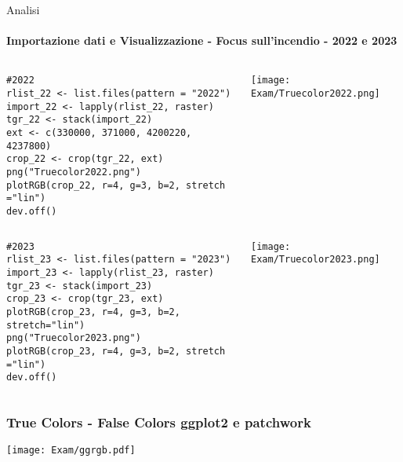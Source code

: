\documentclass{beamer}  %
\begin{document}
\begin{frame}[fragile]{Analisi}
    \framesubtitle{Importazione dati e Visualizzazione - Focus sull'incendio - 2022 e 2023}
    \begin{columns}
        \begin{column}{0.6\textwidth}
            \begin{lstlisting}[style=mystyle]
#2022
rlist_22 <- list.files(pattern = "2022") 
import_22 <- lapply(rlist_22, raster)
tgr_22 <- stack(import_22)
ext <- c(330000, 371000, 4200220, 4237800)
crop_22 <- crop(tgr_22, ext) 
png("Truecolor2022.png")
plotRGB(crop_22, r=4, g=3, b=2, stretch ="lin")
dev.off()
            \end{lstlisting}
        \end{column}
 \begin{column}{0.3\textwidth}
            \texttt{[image: Exam/Truecolor2022.png]}
        \end{column}
    \end{columns}
 \begin{columns}
        \begin{column}{0.6\textwidth}
 \begin{lstlisting}[style=mystyle]
#2023
rlist_23 <- list.files(pattern = "2023") 
import_23 <- lapply(rlist_23, raster)
tgr_23 <- stack(import_23)
crop_23 <- crop(tgr_23, ext) 
plotRGB(crop_23, r=4, g=3, b=2, stretch="lin")
png("Truecolor2023.png")
plotRGB(crop_23, r=4, g=3, b=2, stretch ="lin")
dev.off()
 \end{lstlisting}
\end{column}
        \begin{column}{0.3\textwidth}
            \texttt{[image: Exam/Truecolor2023.png]}
        \end{column}
    \end{columns}

\end{frame}

\begin{frame}[fragile]
    \frametitle{\scriptsize True Colors - False Colors ggplot2 e patchwork}
              \texttt{[image: Exam/ggrgb.pdf]}
                \centering 
\end{frame}
\end{document}
